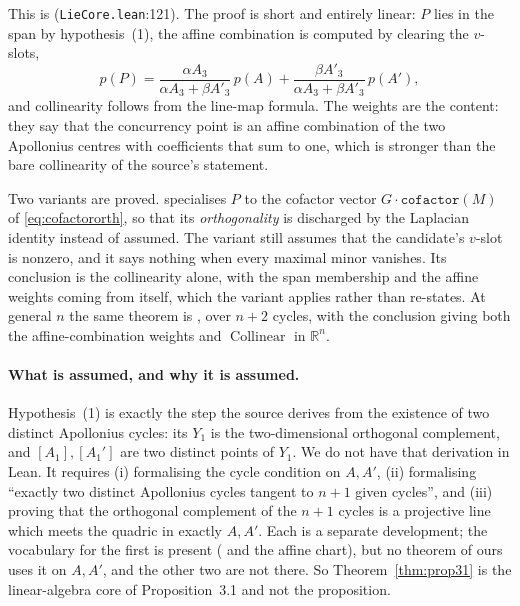 \documentclass[11pt]{article}
\theoremstyle{definition}
\theoremstyle{remark}
\newcommand{\src}[3]{\texttt{#2}:#3}
\newcommand{\RR}{\mathbb{R}}
\begin{document}
This is  (\src{PaperK}{LieCore.lean}{121}). The proof is short and entirely
linear: $P$ lies in the span by hypothesis~(1), the affine combination is computed by clearing the
$v$-slots,
\[
p(P)=\frac{\alpha A_3}{\alpha A_3+\beta A'_3}\,p(A)+\frac{\beta A'_3}{\alpha A_3+\beta A'_3}\,p(A'),
\]
and collinearity follows from the line-map formula. The weights are the content: they say that the
concurrency point is an affine combination of the two Apollonius centres with coefficients that sum
to one, which is stronger than the bare collinearity of the source's statement.

Two variants are proved.  specialises $P$ to the cofactor vector
$G\cdot\texttt{cofactor}(M)$ of \eqref{eq:cofactororth}, so that its \emph{orthogonality} is
discharged by the Laplacian identity instead of assumed. The variant still assumes that the
candidate's $v$-slot is nonzero, and it says nothing when every maximal minor vanishes. Its conclusion
is the collinearity alone, with the span
membership and the affine weights coming from  itself, which the variant applies
rather than re-states. At general $n$ the same theorem is
, over $n+2$ cycles, with the conclusion giving both the affine-combination
weights and $\operatorname{Collinear}$ in $\RR^n$.

\paragraph{What is assumed, and why it is assumed.} Hypothesis~(1) is exactly the step the source
derives from the existence of two distinct Apollonius cycles: its $Y_1$ is the two-dimensional
orthogonal complement, and $[A_1],[A_1']$ are two distinct points of $Y_1$. We do not have that
derivation in Lean. It requires (i) formalising the cycle condition on $A,A'$, (ii) formalising
``exactly two distinct Apollonius cycles tangent to $n+1$ given cycles'', and (iii) proving that the
orthogonal complement of the $n+1$ cycles is a projective line which meets the quadric in exactly
$A,A'$. Each is a separate development; the vocabulary for the first is present
( and the affine chart), but no theorem of ours uses it on $A,A'$,
and the other two are not there. So
Theorem~\ref{thm:prop31} is the linear-algebra core of Proposition~3.1 and not the proposition.
\end{document}
